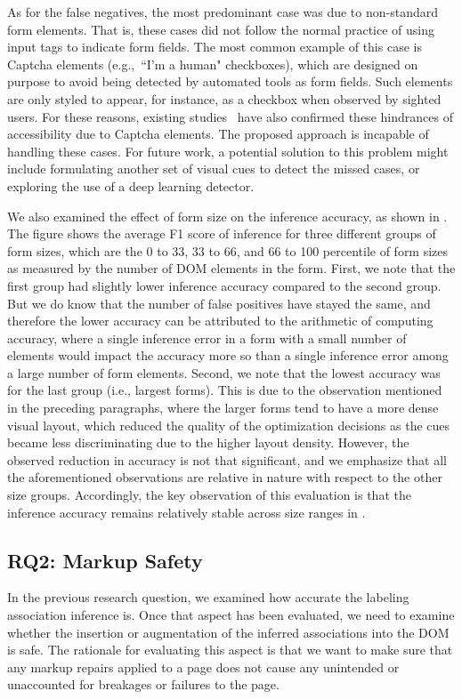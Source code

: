 As for the false negatives, the most predominant case was due to 
non-standard form elements. That is, these cases did not follow 
the normal practice of using input tags to indicate form fields. 
The most common example of this case is Captcha elements 
(e.g.,~``I'm a human" checkboxes), which are designed on purpose to avoid 
being detected by automated tools as form fields.  
Such elements are only styled to appear, for instance, as a 
checkbox when observed by sighted users. For these reasons, 
existing studies~\cite{moreno2014captcha,noorjahan2019bio} have 
also confirmed these hindrances of accessibility due to Captcha elements. 
The proposed approach is incapable of handling these cases. 
For future work, a potential solution to this problem might include 
formulating another set of visual cues to detect the missed cases, 
or exploring the use of a deep learning detector.   

We also examined the effect of form size on the inference accuracy, 
as shown in . The figure shows the average F1 
score of inference for three different groups of form sizes, which 
are the 0 to 33, 33 to 66, and 66 to 100 percentile of form sizes as 
measured by the number of DOM elements in the form. First, we note 
that the first group had slightly lower inference accuracy compared 
to the second group. But we do know that the number of false positives have stayed the same, and therefore the lower accuracy can be attributed to the arithmetic of computing accuracy, where a single inference error in a form with a small number of elements would impact the accuracy more so than a single inference error among a large number of form elements. Second, we note that the lowest accuracy was for the last group (i.e., largest forms). This is due 
to the observation mentioned in the preceding paragraphs, where the 
larger forms tend to have a more dense visual layout, which reduced the 
quality of the optimization decisions as the cues became less 
discriminating due to the higher layout density. However, 
the observed reduction in accuracy is not that significant, and we 
emphasize that all the aforementioned observations are relative in 
nature with respect to the other size groups. Accordingly, the key 
observation of this evaluation is that the inference accuracy remains 
relatively stable across size ranges in .



\subsection{RQ2: Markup Safety}\label{subsec:rq2}
In the previous research question, we examined how accurate the labeling 
association inference is. 
Once that aspect has been evaluated, we need to examine whether 
the insertion or augmentation of the inferred associations into the 
DOM is safe. 
The rationale for evaluating this aspect is that we want to make 
sure that any markup repairs applied to a page does not 
cause any unintended or unaccounted for breakages or failures to the page. 

